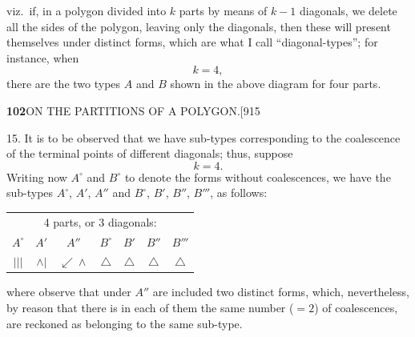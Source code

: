 \documentclass[11pt]{article}
\begin{document}
\noindent viz.\ if, in a polygon divided into $k$ parts by means of $k-1$
diagonals, we delete all the sides of the polygon, leaving only the
diagonals, then these will present themselves under distinct forms, which are
what I call ``diagonal-types''; for instance, when
\[
k=4,
\]
there are the two types $A$ and $B$ shown in the above diagram for four parts.

\newpage
\noindent\textbf{102}\hfill ON THE PARTITIONS OF A POLYGON.\hfill[915

\smallskip
\hspace{1em} 15. It is to be observed that we have sub-types corresponding to
the coalescence of the terminal points of different diagonals; thus, suppose
\[
k=4.
\]
Writing now $A^{\circ}$ and $B^{\circ}$ to denote the forms without
coalescences, we have the sub-types $A^{\circ}$, $A'$, $A''$ and $B^{\circ}$,
$B'$, $B''$, $B'''$, as follows:

\begin{center}
\begin{tabular}{ccccccc}
\multicolumn{7}{c}{4 parts, or 3 diagonals:}\\[2pt]
$A^{\circ}$ & $A'$ & $A''$ & $B^{\circ}$ & $B'$ & $B''$ & $B'''$\\[2pt]
$|||$ & $\wedge|$ & $\swarrow\!\!\wedge$ & $\triangle$ & $\triangle$ & $\triangle$ & $\triangle$\\
\end{tabular}
\end{center}

\noindent where observe that under $A''$ are included two distinct forms,
which, nevertheless, by reason that there is in each of them the same number
($=2$) of coalescences, are reckoned as belonging to the same sub-type.
\end{document}
